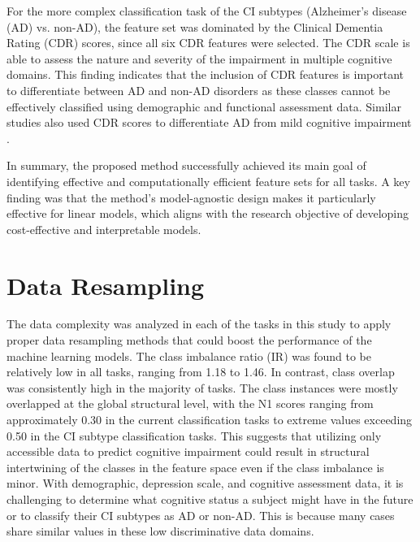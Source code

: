 For the more complex classification task of the CI subtypes (Alzheimer's disease (\acrshort{AD}) vs. non-AD), the feature set was dominated by the Clinical Dementia Rating (\acrshort{CDR}) scores, since all six CDR features were selected. The CDR scale is able to assess the nature and severity of the impairment in multiple cognitive domains. This finding indicates that the inclusion of CDR features is important to differentiate between AD and non-AD disorders as these classes cannot be effectively classified using demographic and functional assessment data. Similar studies also used CDR scores to differentiate AD from mild cognitive impairment \cite{abbas2024Explainable, Pang2023Predicting}. 

In summary, the proposed method successfully achieved its main goal of identifying effective and computationally efficient feature sets for all tasks. A key finding was that the method's model-agnostic design makes it particularly effective for linear models, which aligns with the research objective of developing cost-effective and interpretable models.

\section{Data Resampling}
The data complexity was analyzed in each of the tasks in this study to apply proper data resampling methods that could boost the performance of the machine learning models. The class imbalance ratio (\acrshort{IR}) was found to be relatively low in all tasks, ranging from 1.18 to 1.46. In contrast, class overlap was consistently high in the majority of tasks. The class instances were mostly overlapped at the global structural level, with the \acrshort{N1} scores ranging from approximately 0.30 in the current classification tasks to extreme values exceeding 0.50 in the CI subtype classification tasks. This suggests that utilizing only accessible data to predict cognitive impairment could result in structural intertwining of the classes in the feature space even if the class imbalance is minor. With demographic, depression scale, and cognitive assessment data, it is challenging to determine what cognitive status a subject might have in the future or to classify their CI subtypes as AD or non-AD. This is because many cases share similar values in these low discriminative data domains.

